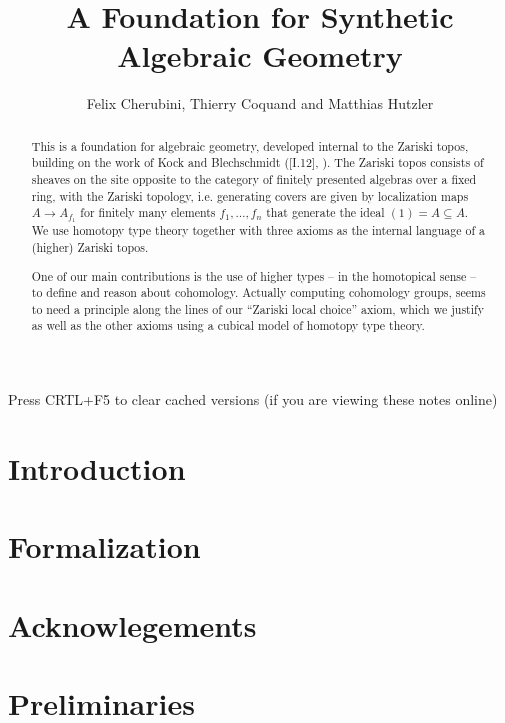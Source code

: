 \documentclass{../util/zariski}
\title{A Foundation for Synthetic Algebraic Geometry}
\author{Felix Cherubini, Thierry Coquand and Matthias Hutzler}
\begin{document}
\maketitle

\begin{center}
  \color{purple}
  \large{Press CRTL+F5 to clear cached versions}
  \large{(if you are viewing these notes online)}
\end{center}

\begin{abstract}
  This is a foundation for algebraic geometry, developed internal to the Zariski topos, building on the work of Kock and Blechschmidt (\cite{kock-sdg}[I.12], \cite{ingo-thesis}).
  The Zariski topos consists of sheaves on the site opposite to the category of finitely presented algebras over a fixed ring, with the Zariski topology, i.e. generating covers are given by localization maps $A\to A_{f_1}$ for finitely many elements $f_1,\dots,f_n$ that generate the ideal $(1)=A\subseteq A$.
  We use homotopy type theory together with three axioms as the internal language of a (higher) Zariski topos.

  One of our main contributions is the use of higher types -- in the homotopical sense -- to define and reason about cohomology.
  Actually computing cohomology groups, seems to need a principle along the lines of our ``Zariski local choice'' axiom,
  which we justify as well as the other axioms using a cubical model of homotopy type theory.
\end{abstract}

\tableofcontents

\section*{Introduction}


\section*{Formalization}


\section*{Acknowlegements}


\section{Preliminaries}

\end{document}
